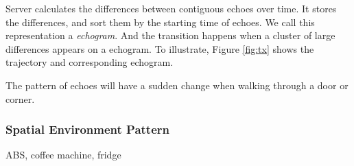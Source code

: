 Server calculates the differences between contiguous echoes over time. It stores the differences,
and sort them by the starting time of echoes. We call this representation a {\em echogram}. And the transition 
happens when a cluster of large
differences appears on a echogram. To illustrate, Figure \ref{fig:tx} shows the trajectory and corresponding 
echogram. 

 


The pattern of 
echoes will have a sudden change when walking through a door or corner.



\subsubsection{Spatial Environment Pattern}

ABS, coffee machine, fridge 